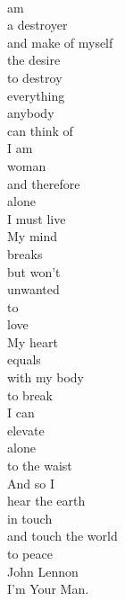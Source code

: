 \documentclass[smalldemyvopaper,11pt,twoside,onecolumn,openright,extrafontsizes]{memoir}
\begin{document}
\\am
\\a destroyer
\\and make of myself
\\the desire
\\to destroy
\\everything
\\anybody
\\can think of
\\I am
\\woman
\\and therefore
\\alone
\\I must live
\\My mind
\\breaks
\\but won't
\\unwanted
\\to
\\love
\\My heart
\\equals
\\with my body
\\to break
\\I can
\\elevate
\\alone
\\to the waist
\\And so I
\\hear the earth
\\in touch
\\and touch the world
\\to peace
\\John Lennon
\\I'm Your Man.
\end{document}
